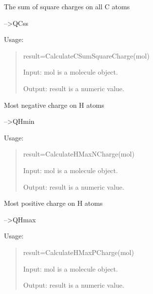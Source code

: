 \documentclass[letterpaper,10pt,english]{sphinxmanual}
\begin{document}

\begin{fulllineitems}
\label{reference/charge:charge.CalculateCSumSquareCharge}
The sum of square charges on all C atoms

--\textgreater{}QCss

Usage:
\begin{quote}

result=CalculateCSumSquareCharge(mol)

Input: mol is a molecule object.

Output: result is a numeric value.
\end{quote}

\end{fulllineitems}


\begin{fulllineitems}
\label{reference/charge:charge.CalculateHMaxNCharge}
Most negative charge on H atoms

--\textgreater{}QHmin

Usage:
\begin{quote}

result=CalculateHMaxNCharge(mol)

Input: mol is a molecule object.

Output: result is a numeric value.
\end{quote}

\end{fulllineitems}


\begin{fulllineitems}
\label{reference/charge:charge.CalculateHMaxPCharge}
Most positive charge on H atoms

--\textgreater{}QHmax

Usage:
\begin{quote}

result=CalculateHMaxPCharge(mol)

Input: mol is a molecule object.

Output: result is a numeric value.
\end{quote}

\end{fulllineitems}
\end{document}

